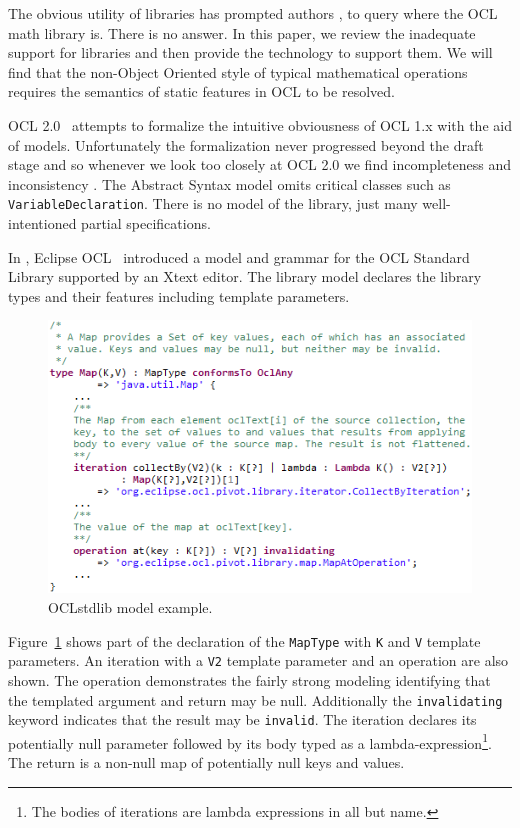 \documentclass[sigconf]{acmart}
\begin{document}
The obvious utility of libraries has prompted authors \cite{Baar2011},\cite{Cabot2012} to query where the OCL math library is. There is no answer. In this paper, we review the inadequate support for libraries and then  provide the technology to support them. We will find that the non-Object Oriented style of typical mathematical operations requires the semantics of static features in OCL to be resolved.

OCL 2.0~\cite{OCL-2.0} attempts to formalize the intuitive obviousness of OCL 1.x with the aid of models. Unfortunately the formalization never progressed beyond the draft stage and so whenever we look too closely at OCL 2.0 we find incompleteness and inconsistency \cite{Willink2020}. The Abstract Syntax model omits critical classes such as \verb|VariableDeclaration|. There is no model of the library, just many well-intentioned partial specifications.

In \cite{Willink2011}, Eclipse OCL~\cite{Eclipse-OCL} introduced a model and grammar for the OCL Standard Library supported by an Xtext editor. The library model declares the library types and their features including template parameters.

\begin{figure}
\includegraphics[width=\columnwidth]{OCLstdlib.png}
\caption{OCLstdlib model example.}
\label{fig:oclstdlib}
\end{figure}

Figure~\ref{fig:oclstdlib} shows part of the declaration of the \verb|MapType| with \verb|K| and \verb|V| template parameters. An iteration with a \verb|V2| template parameter and an operation are also shown. The operation demonstrates the fairly strong modeling identifying that the templated argument and return may be null. Additionally the \verb|invalidating| keyword indicates that the result may be \verb|invalid|. The iteration declares its potentially null parameter followed by its body typed as a lambda-expression\footnote{The bodies of iterations are lambda expressions in all but name.}. The return is a non-null map of potentially null keys and values.
\end{document}
